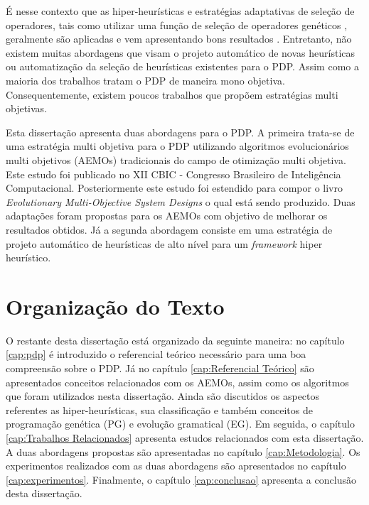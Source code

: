 É nesse contexto que as hiper-heurísticas e estratégias adaptativas de seleção de operadores, tais como utilizar uma função de seleção de operadores genéticos \cite{misir2012intelligent}, geralmente são aplicadas e vem apresentando bons resultados \cite{burke2013hyper}. Entretanto, não existem muitas abordagens que visam o projeto automático de novas heurísticas ou automatização da seleção de heurísticas existentes para o PDP. Assim como a maioria dos trabalhos tratam o PDP de maneira mono objetiva. Consequentemente, existem poucos trabalhos que propõem estratégias multi objetivas.

Esta dissertação apresenta duas abordagens para o PDP. A primeira trata-se de uma estratégia multi objetiva para o PDP utilizando algoritmos evolucionários multi objetivos (AEMOs) tradicionais do campo de otimização multi objetiva. Este estudo \cite{fontouralimacbic2015} foi publicado no XII CBIC - Congresso Brasileiro de Inteligência Computacional. Posteriormente este estudo foi estendido para compor o livro \textit{Evolutionary Multi-Objective System Designs} o qual está sendo produzido. Duas adaptações foram propostas para os AEMOs com objetivo de melhorar os resultados obtidos. Já a segunda abordagem consiste em uma estratégia de projeto automático de heurísticas de alto nível para um \textit{framework} hiper heurístico.




\section{Organização do Texto}
\label{Introducao:Organizacao do Texto}

O restante desta dissertação está organizado da seguinte maneira: no capítulo \ref{cap:pdp} é introduzido o referencial teórico necessário para uma boa compreensão sobre o PDP. Já no capítulo \ref{cap:Referencial Teórico} são apresentados conceitos relacionados com os AEMOs, assim como os algoritmos que foram utilizados nesta dissertação. Ainda são discutidos os aspectos referentes as hiper-heurísticas, sua classificação e também conceitos de programação genética (PG) e evolução gramatical (EG). Em seguida, o capítulo \ref{cap:Trabalhos Relacionados} apresenta estudos relacionados com esta dissertação. A duas abordagens propostas são apresentadas no capítulo \ref{cap:Metodologia}. Os experimentos realizados com as duas abordagens são apresentados no capítulo \ref{cap:experimentos}. Finalmente, o capítulo \ref{cap:conclusao} apresenta a conclusão desta dissertação.







 